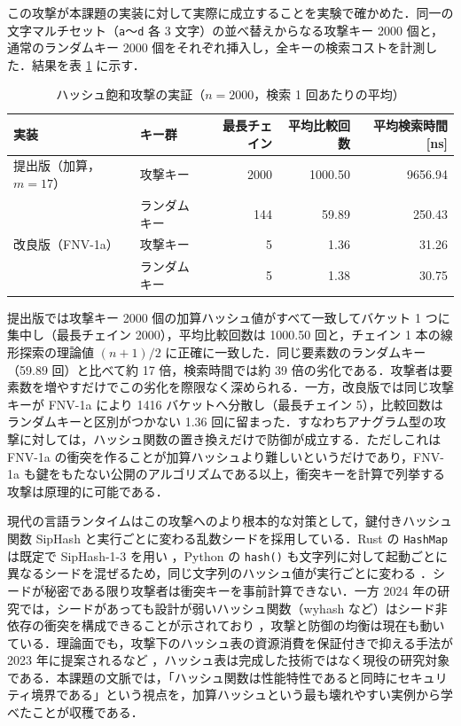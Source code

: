 この攻撃が本課題の実装に対して実際に成立することを実験で確かめた．同一の文字マルチセット（{\tt a}〜{\tt d} 各 3 文字）の並べ替えからなる攻撃キー 2000 個と，通常のランダムキー 2000 個をそれぞれ挿入し，全キーの検索コストを計測した．結果を表 \ref{tab:hashdos} に示す．

\begin{table}[htbp]
\centering
\caption{ハッシュ飽和攻撃の実証（$n=2000$，検索 1 回あたりの平均）}
\label{tab:hashdos}
\begin{tabular}{llrrr}
\hline
実装 & キー群 & 最長チェイン & 平均比較回数 & 平均検索時間 [ns] \\
\hline
提出版（加算，$m=17$） & 攻撃キー     & 2000 & 1000.50 & 9656.94 \\
                       & ランダムキー & 144  & 59.89   & 250.43 \\
改良版（FNV-1a）       & 攻撃キー     & 5    & 1.36    & 31.26 \\
                       & ランダムキー & 5    & 1.38    & 30.75 \\
\hline
\end{tabular}
\end{table}

提出版では攻撃キー 2000 個の加算ハッシュ値がすべて一致してバケット 1 つに集中し（最長チェイン 2000），平均比較回数は 1000.50 回と，チェイン 1 本の線形探索の理論値 $(n+1)/2$ に正確に一致した．同じ要素数のランダムキー（59.89 回）と比べて約 17 倍，検索時間では約 39 倍の劣化である．攻撃者は要素数を増やすだけでこの劣化を際限なく深められる．一方，改良版では同じ攻撃キーが FNV-1a により 1416 バケットへ分散し（最長チェイン 5），比較回数はランダムキーと区別がつかない 1.36 回に留まった．すなわちアナグラム型の攻撃に対しては，ハッシュ関数の置き換えだけで防御が成立する．ただしこれは FNV-1a の衝突を作ることが加算ハッシュより難しいというだけであり，FNV-1a も鍵をもたない公開のアルゴリズムである以上，衝突キーを計算で列挙する攻撃は原理的に可能である．

現代の言語ランタイムはこの攻撃へのより根本的な対策として，鍵付きハッシュ関数 SipHash と実行ごとに変わる乱数シードを採用している．Rust の {\tt HashMap} は既定で SipHash-1-3 を用い \cite{sling2025}，Python の {\tt hash()} も文字列に対して起動ごとに異なるシードを混ぜるため，同じ文字列のハッシュ値が実行ごとに変わる \cite{chenna2023}．シードが秘密である限り攻撃者は衝突キーを事前計算できない．一方 2024 年の研究では，シードがあっても設計が弱いハッシュ関数（wyhash など）はシード非依存の衝突を構成できることが示されており \cite{orlp2024}，攻撃と防御の均衡は現在も動いている．理論面でも，攻撃下のハッシュ表の資源消費を保証付きで抑える手法が 2023 年に提案されるなど \cite{depthcharge2023}，ハッシュ表は完成した技術ではなく現役の研究対象である．本課題の文脈では，「ハッシュ関数は性能特性であると同時にセキュリティ境界である」という視点を，加算ハッシュという最も壊れやすい実例から学べたことが収穫である．

